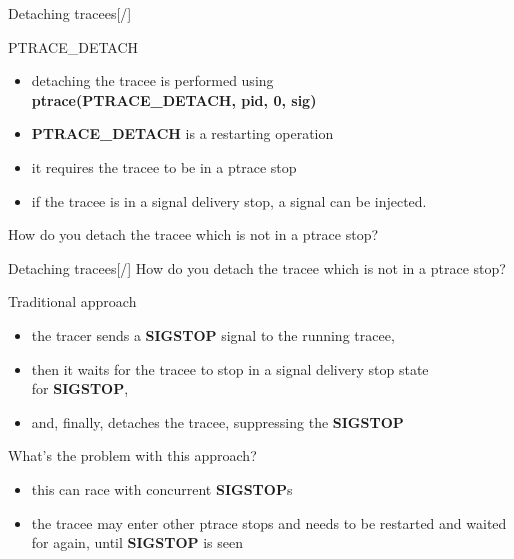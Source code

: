 \documentclass[unicode,aspectratio=169,xcolor={table,dvipsnames,usernames}]{beamer}
\begin{document}
\begin{frame}{\Large Detaching tracees\hfill [\insertframenumber/\inserttotalframenumber]}
\Large
\begin{block}{PTRACE\_DETACH}
\begin{itemize}
	\item detaching the tracee is performed using \\
		\textbf{ptrace(PTRACE\_DETACH, pid, 0, sig)}
	\item \textbf{PTRACE\_DETACH} is a restarting operation
	\item it requires the tracee to be in a ptrace stop
	\item if the tracee is in a signal delivery stop,
		a signal can be injected.
\end{itemize}
\end{block}

How do you detach the tracee which is not in a ptrace stop?
\end{frame}

\begin{frame}{\Large Detaching tracees\hfill [\insertframenumber/\inserttotalframenumber]}
\Large
How do you detach the tracee which is not in a ptrace stop?

\begin{block}{Traditional approach}
\begin{itemize}
	\item the tracer sends a \textbf{SIGSTOP} signal to the running tracee,
	\item then it waits for the tracee to stop in a signal delivery stop state \\
		for \textbf{SIGSTOP},
	\item and, finally, detaches the tracee, suppressing the \textbf{SIGSTOP}
\end{itemize}
\end{block}

\begin{block}{What's the problem with this approach?}
\begin{itemize}
	\item this can race with concurrent \textbf{SIGSTOP}s
	\item the tracee may enter other ptrace stops and needs
		to be restarted and waited for again, until \textbf{SIGSTOP} is seen
\end{itemize}
\end{block}
\end{frame}
\end{document}
